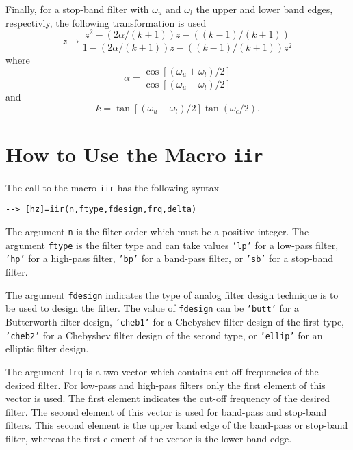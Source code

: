 	Finally, for a stop-band filter with $\omega_u$ and $\omega_l$
the upper and lower band edges, respectivly, the following transformation
is used
%
\begin{equation}
z\rightarrow\frac{z^2-(2\alpha/(k+1))z-((k-1)/(k+1))}{1-(2\alpha/(k+1))z-((k-1)/(k+1))z^2}
\label{e.iir.h}
\end{equation}
%
where
%
\begin{equation}
\alpha=\frac{\cos[(\omega_u+\omega_l)/2]}{\cos[(\omega_u-\omega_l)/2]}
\label{e.iir.i}
\end{equation}
%
and
%
\begin{equation}
k=\tan[(\omega_u-\omega_l)/2]\tan(\omega_c/2).
\label{e.iir.j}
\end{equation}
%
\section{How to Use the Macro {\tt iir}}

	The call to the macro {\tt iir} has the following syntax
\begin{verbatim}
--> [hz]=iir(n,ftype,fdesign,frq,delta)
\end{verbatim}
The argument {\tt n} is the filter order which must be a positive integer.
The argument {\tt ftype} is the filter type and can take values
{\tt 'lp'} for a low-pass filter, {\tt 'hp'} for a high-pass filter,
{\tt 'bp'} for a band-pass filter, or {\tt 'sb'} for a stop-band filter.

	The argument {\tt fdesign} indicates the type of analog filter design
technique is to be used to design the filter.  The value of {\tt fdesign}
can be {\tt 'butt'} for a Butterworth filter design, {\tt 'cheb1'}
for a Chebyshev filter design of the first type, {\tt 'cheb2'}
for a Chebyshev filter design of the second type, or {\tt 'ellip'}
for an elliptic filter design.  

	The argument {\tt frq} is a two-vector
which contains cut-off frequencies of the desired filter.  For low-pass
and high-pass filters only the first element of this vector is used.
The first element indicates the cut-off frequency of the desired filter.
The second element of this vector is used
for band-pass and stop-band filters.  This second element is the upper
band edge of the band-pass or stop-band filter, whereas the first
element of the vector is the lower band edge.

